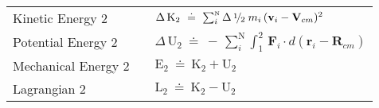 \documentclass[10pt]{article}
\newcommand{\med}{\raise.5ex\hbox{$\scriptstyle 1$}\kern-.15em/\kern-.09em\lower.25ex\hbox{$\scriptstyle 2$}}
\begin{document}
\begin{tabular}{lll}
Kinetic Energy 2 & \hspace{+0.00em} & $\Delta \, {\mathrm{K}}_2 ~\doteq~ \sum_i^{\scriptscriptstyle{\mathrm{N}}} \Delta \, \med \; m_i \, ({\mathbf{v}}_{i} - {\mathbf{V}}_{cm})^2$ \vspace{+0.99em} \\
Potential Energy 2 & \hspace{+0.00em} & $\Delta \, {\mathrm{U}}_2 ~\doteq~ - \, \sum_i^{\scriptscriptstyle{\mathrm{N}}} \int_{\scriptscriptstyle 1}^{\scriptscriptstyle 2} \, {\mathbf{F}}_i \cdot d({\mathbf{r}}_{i} - {\mathbf{R}}_{cm})$ \vspace{+0.99em} \\
Mechanical Energy 2 & \hspace{+0.00em} & ${\mathrm{E}}_2 ~\doteq~ {\mathrm{K}}_2 + {\mathrm{U}}_2$ \vspace{+0.99em} \\
Lagrangian 2 & \hspace{+0.00em} & ${\mathrm{L}}_2 ~\doteq~ {\mathrm{K}}_2 - {\mathrm{U}}_2$
\end{tabular}

\newpage
\end{document}
